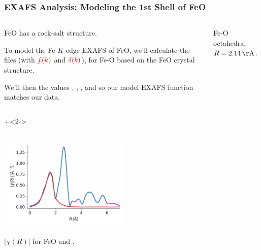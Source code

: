 \begin{frame}
\frametitle{EXAFS Analysis: Modeling the 1st Shell of FeO}

\begin{cenpage}{135mm}
    \begin{columns}
      \begin{column}{80mm}
        FeO has a rock-salt structure.
        \vmm\vmm

        To model the Fe $K$ edge EXAFS of FeO, we'll calculate the
        {} files (with ${{\Red{f(k)}}}$ and
        ${{\Red{\delta(k)}}}$), for Fe-O based on the FeO crystal
        structure.

        \vmm

        We'll then  {} the values
        {}, {},
        {}, and {} so our
        model EXAFS function matches our data.
        \vspace{2mm}

      \end{column}
      \begin{column}{25mm}


         Fe-O octahedra, ${R=2.14\rm\,\AA}$.

    \end{column}
    \end{columns}

    \onslide+<2->

    \begin{columns}
      \begin{column}{65mm}

        \vspace{-3mm}
        \includegraphics[width=63mm]{figs/fits/feo_1sh_chirmag}

        \vmm
        ${|\chi(R)|}$ for FeO {} and {}.


\end{column}
\end{columns}
\end{cenpage}
\end{frame}
